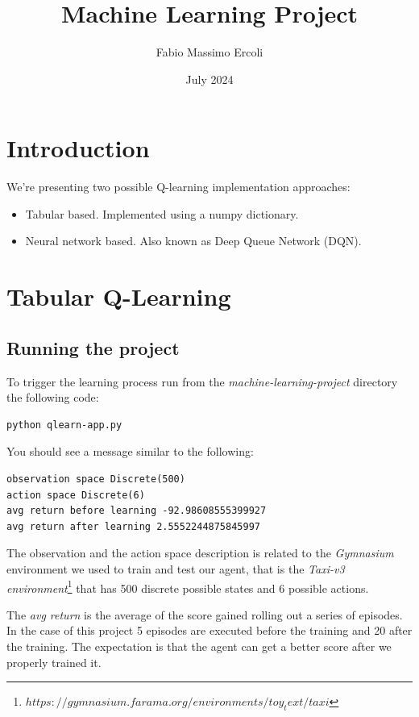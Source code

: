 \documentclass{article}
\title{\textbf{Machine Learning Project}}
\author{Fabio Massimo Ercoli}
\date{July 2024}
\begin{document}
\maketitle

\section{Introduction}

We're presenting two possible Q-learning implementation approaches:
\begin{itemize}
  \item Tabular based. Implemented using a numpy dictionary.
  \item Neural network based. Also known as Deep Queue Network (DQN).
\end{itemize}

\section{Tabular Q-Learning}

\subsection{Running the project}

To trigger the learning process run from the \emph{machine-learning-project} directory the following code:

\begin{verbatim}
python qlearn-app.py
\end{verbatim}

You should see a message similar to the following:

\begin{verbatim}
observation space Discrete(500)
action space Discrete(6)
avg return before learning -92.98608555399927
avg return after learning 2.5552244875845997
\end{verbatim}

The observation and the action space description is related to the \emph{Gymnasium} environment 
we used to train and test our agent, that is the 
\emph{Taxi-v3 environment}\footnote[1]{$https://gymnasium.farama.org/environments/toy_text/taxi$} 
that has 500 discrete possible states and 6 possible actions.

The \emph{avg return} is the average of the score gained rolling out a series of episodes.
In the case of this project 5 episodes are executed before the training and 20 after the training.
The expectation is that the agent can get a better score after we properly trained it.
\end{document}
